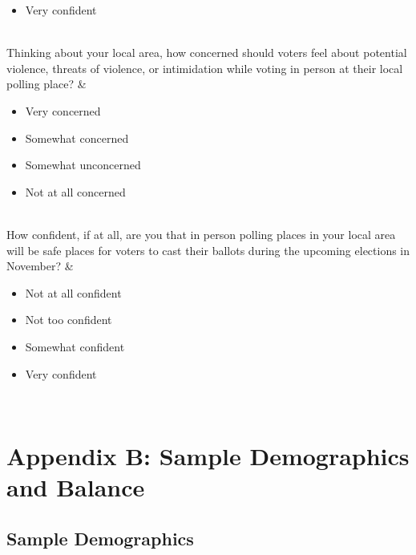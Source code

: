 \documentclass[
  12pt,
  letterpaper,
]{article}
\begin{document}
\begin{table}[H]
{\begin{tblr}[         %
]
\begin{itemize}
\item Very confident

\end{itemize}\endminipage \\
Thinking about your local area, how concerned should voters feel about potential violence, threats of violence, or intimidation while voting in person at their local polling place? & \minipage{\textwidth}\begin{itemize}
\item Very concerned

\item Somewhat concerned

\item Somewhat unconcerned

\item Not at all concerned

\end{itemize}\endminipage \\
How confident, if at all, are you that in person polling places in your local area will be safe places for voters to cast their ballots during the upcoming elections in November? & \minipage{\textwidth}\begin{itemize}
\item Not at all confident

\item Not too confident

\item Somewhat confident

\item Very confident

\end{itemize}\endminipage \\
\bottomrule
\end{tblr}

}

\end{table}%

\newpage{}

\section{Appendix B: Sample Demographics and
Balance}\label{appendix-b-sample-demographics-and-balance}

\subsection{Sample Demographics}\label{sample-demographics}
\end{document}
